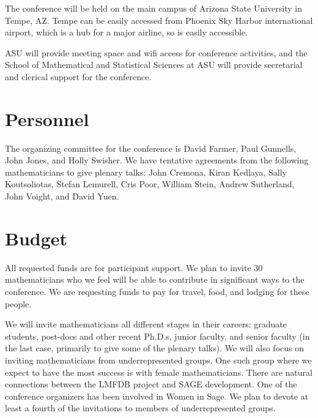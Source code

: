\documentclass[12pt]{amsart}
\numberwithin{equation}{section}
\begin{document}
The conference will be held on the main campus of Arizona State
University in Tempe, AZ.  Tempe can be easily accessed from Phoenix
Sky Harbor international airport, which is a hub for a major airline,
so is easily accessible.

ASU will provide meeting space and wifi access for conference
activities, and the School of Mathematical and Statistical Sciences at
ASU will provide secretarial and clerical support for the conference.

\section{Personnel}

The organizing committee for the conference is David
Farmer, Paul Gunnells, 
John Jones, and Holly Swisher.
%
We have tentative agreements from the following mathematicians to give
plenary talks:
John Cremona, Kiran Kedlaya, Sally Koutsoliotas, Stefan Lemurell, 
Cris Poor, William Stein, Andrew Sutherland, John Voight, and David Yuen.




\section{Budget}

All requested funds are for participant support.  We plan to invite
$30$ mathematicians who we feel will be able to contribute in
significant ways to the conference.  We are requesting funds to pay
for travel, food, and lodging for these people.

We will invite mathematicians all different stages in their careers:
graduate students, post-docs and other recent Ph.D.s, junior faculty,
and senior faculty (in the last case, primarily to give some of the
plenary talks).  We will also focus on inviting mathematicians from
underrepresented groups.  One such group where we expect to have the
most success is with female mathematicians.  There are natural
connections between the LMFDB project and SAGE development.  One of
the conference organizers has been involved in Women in Sage.  We plan
to devote at least a fourth of the invitations to members of
underrepresented groups.
\end{document}
